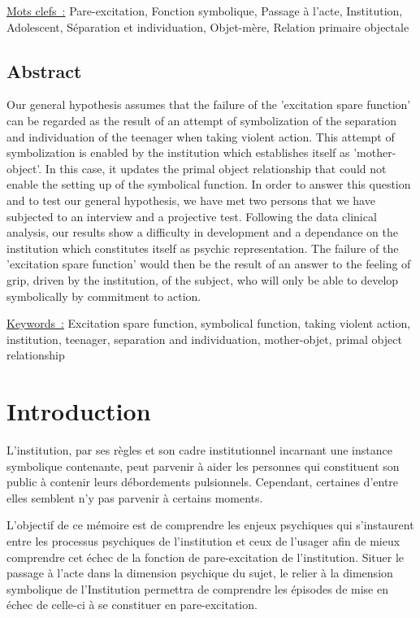\documentclass[12pt, a4paper]{book}
\begin{document}
\begin{spacing}{1.5}
\vspace{1cm}

\underline{Mots clefs :} Pare-excitation, Fonction symbolique, Passage à l’acte, Institution, Adolescent, Séparation et individuation, Objet-mère, Relation primaire objectale


\section*{Abstract}
Our general hypothesis assumes that the failure of the 'excitation spare function' can be regarded as the result of an attempt of symbolization of the separation and individuation of the teenager when taking violent action. This attempt of symbolization is enabled by the institution which establishes itself as 'mother-object'. In this case, it updates the primal object relationship that could not enable the setting up of the symbolical function. In order to answer this question and to test our general hypothesis, we have met two persons that we have subjected to an interview and a projective test. Following the data clinical analysis, our results show a difficulty in development and a dependance on the institution which constitutes itself as psychic representation.
The failure of the 'excitation spare function' would then be the result of an answer to the feeling of grip, driven by the institution, of the subject, who will only be able to develop symbolically by commitment to action.

\vspace{1cm}

\thispagestyle{empty}
\underline{Keywords :} Excitation spare function, symbolical function, taking violent action, institution, teenager, separation and individuation, mother-objet, primal object relationship
\chapter*{Introduction}

\thispagestyle{empty}
L'institution, par ses règles et son cadre institutionnel incarnant une instance symbolique contenante, peut parvenir à aider les personnes qui constituent son  public à contenir leurs débordements pulsionnels. Cependant, certaines d'entre elles semblent n'y pas parvenir à certains moments.

L'objectif de ce mémoire est de comprendre les enjeux psychiques qui s'instaurent entre les processus psychiques de l'institution et ceux de l'usager afin de mieux comprendre cet échec de la fonction de pare-excitation de  l'institution. Situer le passage à l'acte dans la dimension psychique du sujet, le relier à la dimension symbolique de l'Institution permettra de comprendre les épisodes de mise en échec de celle-ci  à se constituer en pare-excitation.


\end{spacing}
\end{document}
